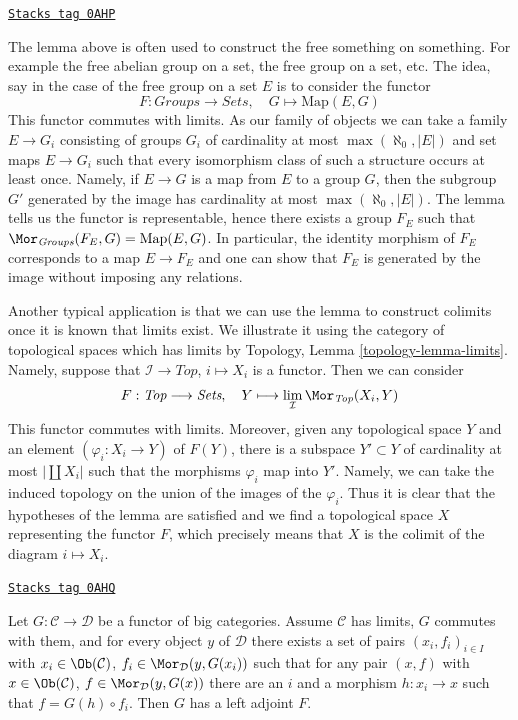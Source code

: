 \begin{remark}
\label{categories-remark-how-to-use-it}
\href{https://stacks.math.columbia.edu/tag/0AHP}{\texttt{Stacks tag 0AHP}}

The lemma above is often used to construct the free something on something.
For example the free abelian group on a set, the free group on a set, etc.
The idea, say in the case of the free group on a set $E$ is to
consider the functor
$$
F : \textit{Groups} \to \textit{Sets},\quad
G \longmapsto \text{Map}(E, G)
$$
This functor commutes with limits. As our family of objects
we can take a family $E \to G_i$ consisting of groups $G_i$
of cardinality at most $\max(\aleph_0, |E|)$ and set maps
$E \to G_i$ such that every isomorphism class of such a structure
occurs at least once. Namely, if $E \to G$ is a map from $E$ to
a group $G$, then the subgroup $G'$ generated by the image has
cardinality at most $\max(\aleph_0, |E|)$. The lemma tells us
the functor is representable, hence there exists a group
$F_E$ such that $\Mor_{\textit{Groups}}(F_E, G) = \text{Map}(E, G)$.
In particular, the identity morphism of $F_E$ corresponds to
a map $E \to F_E$ and one can show that $F_E$ is generated by
the image without imposing any relations.

\medskip\noindent
Another typical application is that we can use the lemma to construct
colimits once it is known that limits exist. We illustrate it using
the category of topological spaces which has limits by
Topology, Lemma \ref{topology-lemma-limits}. Namely, suppose
that $\mathcal{I} \to \textit{Top}$, $i \mapsto X_i$ is a functor.
Then we can consider
$$
F : \textit{Top} \longrightarrow \textit{Sets},\quad
Y \longmapsto \lim_\mathcal{I} \Mor_{\textit{Top}}(X_i, Y)
$$
This functor commutes with limits. Moreover, given any topological space
$Y$ and an element $(\varphi_i : X_i \to Y)$ of $F(Y)$, there is
a subspace $Y' \subset Y$ of cardinality at most $|\coprod X_i|$
such that the morphisms $\varphi_i$ map into $Y'$. Namely, we can
take the induced topology on the union of the images of the $\varphi_i$.
Thus it is clear that the hypotheses of the lemma are satisfied and we find a
topological space $X$
representing the functor $F$, which precisely means that $X$ is
the colimit of the diagram $i \mapsto X_i$.
\end{remark}

\begin{theorem}

\label{categories-theorem-adjoint-functor}
\href{https://stacks.math.columbia.edu/tag/0AHQ}{\texttt{Stacks tag 0AHQ}}

Let $G : \mathcal{C} \to \mathcal{D}$ be a functor of big categories.
Assume $\mathcal{C}$ has limits, $G$ commutes with them, and for
every object $y$ of $\mathcal{D}$ there exists a set of pairs
$(x_i, f_i)_{i \in I}$ with $x_i \in \Ob(\mathcal{C})$,
$f_i \in \Mor_\mathcal{D}(y, G(x_i))$ such that for any
pair $(x, f)$ with $x \in \Ob(\mathcal{C})$,
$f \in \Mor_\mathcal{D}(y, G(x))$ there are an $i$ and a morphism
$h : x_i \to x$ such that $f = G(h) \circ f_i$.
Then $G$ has a left adjoint $F$.
\end{theorem}

